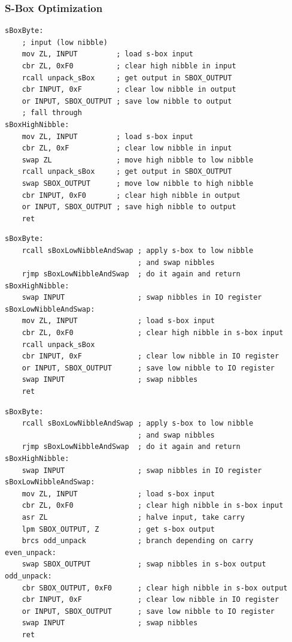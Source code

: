 \documentclass{beamer}
\begin{document}
\begin{frame}[fragile]
\frametitle{S-Box Optimization}
\begin{overprint}
\begin{lstlisting}
sBoxByte:
    ; input (low nibble)
    mov ZL, INPUT         ; load s-box input
    cbr ZL, 0xF0          ; clear high nibble in input
    rcall unpack_sBox     ; get output in SBOX_OUTPUT
    cbr INPUT, 0xF        ; clear low nibble in output
    or INPUT, SBOX_OUTPUT ; save low nibble to output
    ; fall through
sBoxHighNibble:
    mov ZL, INPUT         ; load s-box input
    cbr ZL, 0xF           ; clear low nibble in input
    swap ZL               ; move high nibble to low nibble
    rcall unpack_sBox     ; get output in SBOX_OUTPUT
    swap SBOX_OUTPUT      ; move low nibble to high nibble
    cbr INPUT, 0xF0       ; clear high nibble in output
    or INPUT, SBOX_OUTPUT ; save high nibble to output
    ret
\end{lstlisting}
\begin{lstlisting}
sBoxByte:
    rcall sBoxLowNibbleAndSwap ; apply s-box to low nibble
                               ; and swap nibbles
    rjmp sBoxLowNibbleAndSwap  ; do it again and return
sBoxHighNibble:
    swap INPUT                 ; swap nibbles in IO register
sBoxLowNibbleAndSwap:
    mov ZL, INPUT              ; load s-box input
    cbr ZL, 0xF0               ; clear high nibble in s-box input
    rcall unpack_sBox
    cbr INPUT, 0xF             ; clear low nibble in IO register
    or INPUT, SBOX_OUTPUT      ; save low nibble to IO register
    swap INPUT                 ; swap nibbles
    ret
\end{lstlisting}
\begin{lstlisting}
sBoxByte:
    rcall sBoxLowNibbleAndSwap ; apply s-box to low nibble
                               ; and swap nibbles
    rjmp sBoxLowNibbleAndSwap  ; do it again and return
sBoxHighNibble:
    swap INPUT                 ; swap nibbles in IO register
sBoxLowNibbleAndSwap:
    mov ZL, INPUT              ; load s-box input
    cbr ZL, 0xF0               ; clear high nibble in s-box input
    asr ZL                     ; halve input, take carry
    lpm SBOX_OUTPUT, Z         ; get s-box output
    brcs odd_unpack            ; branch depending on carry
even_unpack:
    swap SBOX_OUTPUT           ; swap nibbles in s-box output
odd_unpack:
    cbr SBOX_OUTPUT, 0xF0      ; clear high nibble in s-box output
    cbr INPUT, 0xF             ; clear low nibble in IO register
    or INPUT, SBOX_OUTPUT      ; save low nibble to IO register
    swap INPUT                 ; swap nibbles
    ret
\end{lstlisting}
\end{overprint}
\end{frame}
\end{document}
